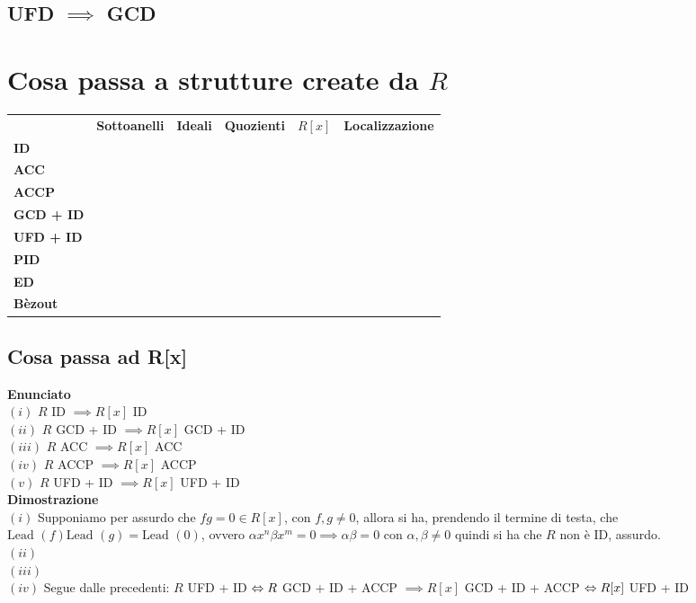\documentclass[a4paper,GeneralMath,NoNotes]{stdmdoc}
\newcommand{\Enunciato}{\vskip 0.05cm \noindent \textbf{Enunciato} \\ }
\renewcommand{\Dimostrazione}{\vskip 0.05cm \noindent \textbf{Dimostrazione} \\ }
\newcommand{\Lead}{\text{Lead }}
\begin{document}
	\subsection{UFD $\implies$ GCD}

	\section*{Cosa passa a strutture create da $R$}
	
	\begin{tabular}{lccccc}
	 & {\bf Sottoanelli} & {\bf Ideali} & {\bf Quozienti} & {\bf $R[x]$} & {\bf Localizzazione} \\
	{\bf ID} & \checkmark & \checkmark & & \checkmark & \\
	{\bf ACC} & & & & \checkmark & \\
	{\bf ACCP} & & & & \checkmark & \\
	{\bf GCD + ID} & & & & \checkmark & \\
	{\bf UFD + ID} & & & & \checkmark & \\
	{\bf PID} & & & & \crossmark & \\
	{\bf ED} & & & & \crossmark & \\
	{\bf Bèzout} & & & & & \\
	
	\end{tabular} \vskip 1cm

	
	\subsection{Cosa passa ad R[x]}
	\Enunciato
		$(i)$ $R$ ID $\implies R[x]$ ID \\
		$(ii)$ $R$ GCD + ID $\implies R[x]$ GCD + ID \\
		$(iii)$ $R$ ACC $\implies R[x]$ ACC \\
		$(iv)$ $R$ ACCP $\implies R[x]$ ACCP \\
		$(v)$ $R$ UFD + ID $\implies R[x]$ UFD + ID \\

	\Dimostrazione
		$(i)$ Supponiamo per assurdo che $fg = 0 \in R[x]$, con $f, g \neq 0$, allora si ha, prendendo il termine di testa, che $\Lead(f)\Lead(g) = \Lead(0)$, ovvero $\alpha x^n \beta x^m = 0 \implies \alpha \beta = 0$ con $\alpha, \beta \neq 0$ quindi si ha che $R$ non è ID, assurdo. \\
		$(ii)$ \\
		$(iii)$ \\
		$(iv)$ Segue dalle precedenti: $R$ UFD + ID $\Leftrightarrow R$ GCD + ID + ACCP $\implies R[x]$ GCD + ID + ACCP $\Leftrightarrow R[x]$ UFD + ID \\
\end{document}
